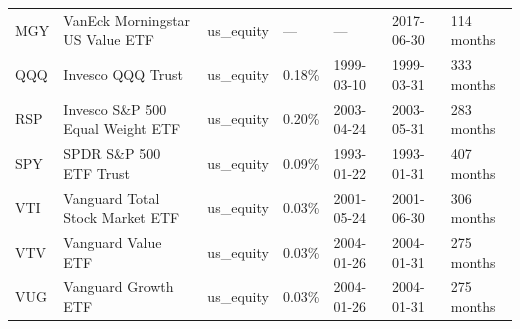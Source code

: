 \begin{tabularx}{\textwidth}{@{}P{0.46in}P{1.06in}P{0.62in}P{0.48in}P{0.50in}P{0.54in}Y@{}}
MGY & VanEck Morningstar US Value ETF & us\_equity & --- & --- & 2017-06-30 & 114 months \\
QQQ & Invesco QQQ Trust & us\_equity & 0.18\% & 1999-03-10 & 1999-03-31 & 333 months \\
RSP & Invesco S\&P 500 Equal Weight ETF & us\_equity & 0.20\% & 2003-04-24 & 2003-05-31 & 283 months \\
SPY & SPDR S\&P 500 ETF Trust & us\_equity & 0.09\% & 1993-01-22 & 1993-01-31 & 407 months \\
VTI & Vanguard Total Stock Market ETF & us\_equity & 0.03\% & 2001-05-24 & 2001-06-30 & 306 months \\
VTV & Vanguard Value ETF & us\_equity & 0.03\% & 2004-01-26 & 2004-01-31 & 275 months \\
VUG & Vanguard Growth ETF & us\_equity & 0.03\% & 2004-01-26 & 2004-01-31 & 275 months \\
\bottomrule
\end{tabularx}
